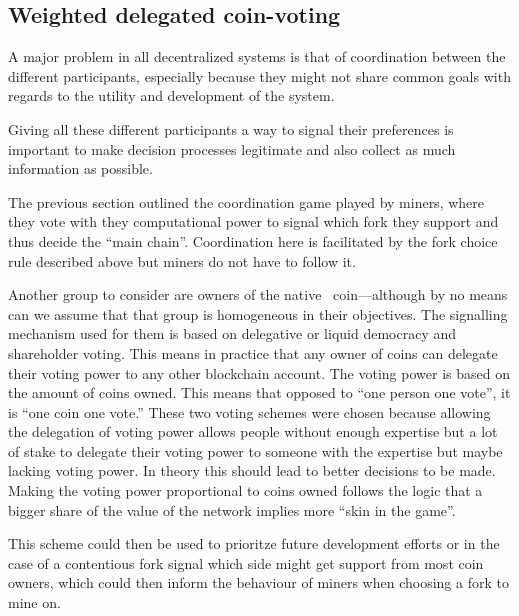 \subsection{Weighted delegated coin-voting}

A major problem in all decentralized systems is that of coordination between
the different participants, especially because they might not share common
goals with regards to the utility and development of the system.

Giving all these different participants a way to signal their preferences is
important to make decision processes legitimate and also collect as much
information as possible.

The previous section outlined the coordination game played by miners, where
they vote with they computational power to signal which fork they support and
thus decide the \enquote{main chain}. Coordination here is facilitated by the
fork choice rule described above but miners do not have to follow it.

Another group to consider are owners of the native \aet\ coin---although by no
means can we assume that that group is homogeneous in their objectives. The
signalling mechanism used for them is based on delegative
 or liquid democracy \cite{ford2002delegative} and shareholder voting. This
means in practice that any owner of coins can delegate their voting power to
any other blockchain account. The voting power is based on the amount of coins
owned. This means that opposed to \enquote{one person one vote}, it is
\enquote{one coin one vote.}
These two voting schemes were chosen because allowing the delegation of voting
power allows people without enough expertise but a lot of stake to
delegate their voting power to someone with the expertise but maybe lacking
voting power. In theory this should lead to better decisions to be made. Making
the voting power proportional to coins owned follows the logic that a bigger
share of the value of the network implies more \enquote{skin in the game}.

This scheme could then be used to prioritze future development efforts or in
the case of a contentious fork signal which side might get support from most
coin owners, which could then inform the behaviour of miners when choosing a
fork to mine on.

